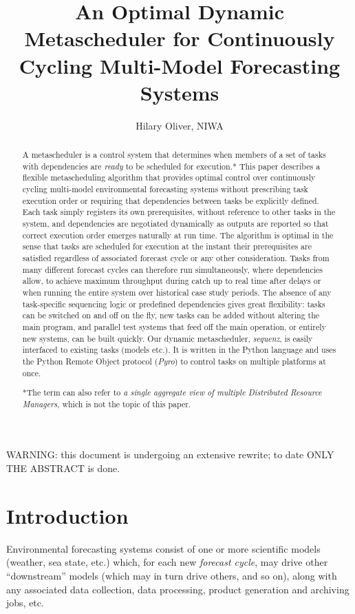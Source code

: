 \documentclass[11pt,a4paper]{article}
\title{An Optimal Dynamic Metascheduler for Continuously Cycling
Multi-Model Forecasting Systems}
\author{Hilary Oliver, NIWA}
\begin{document}
\maketitle
\tableofcontents

{\huge WARNING: this document is undergoing an extensive rewrite; to
date ONLY THE ABSTRACT is done.}

\begin{abstract}
A metascheduler is a control system that determines when members of a
set of tasks with dependencies are {\em ready} to be scheduled for
execution.* This paper describes a flexible metascheduling algorithm
that provides optimal control over continuously cycling multi-model
environmental forecasting systems without prescribing task execution
order or requiring that dependencies between tasks be explicitly
defined. Each task simply registers its own prerequisites, without
reference to other tasks in the system, and dependencies are negotiated
dynamically as outputs are reported so that correct execution order
emerges naturally at run time.  The algorithm is optimal in the sense
that tasks are scheduled for execution at the instant their
prerequisites are satisfied regardless of associated forecast cycle or
any other consideration. Tasks from many different forecast cycles can
therefore run simultaneously, where dependencies allow, to achieve
maximum throughput during catch up to real time after delays or when
running the entire system over historical case study periods. The
absence of any task-specific sequencing logic or predefined dependencies
gives great flexibility: tasks can be switched on and off on the fly,
new tasks can be added without altering the main program, and parallel
test systems that feed off the main operation, or entirely new systems,
can be built quickly.  Our dynamic metascheduler, {\em sequenz}, is
easily interfaced to existing tasks (models etc.). It is written in the
Python language and uses the Python Remote Object protocol ({\em Pyro})
to control tasks on multiple platforms at once. 

*The term can also refer to {\it a single aggregate view of multiple
Distributed Resource Managers}, which is not the topic of this paper.

\end{abstract}
\section{Introduction}

Environmental forecasting systems consist of one or more scientific
models (weather, sea state, etc.) which, for each new {\em forecast
cycle}, may drive other ``downstream'' models (which may in turn drive
others, and so on), along with any associated data collection, data
processing, product generation and archiving jobs, etc.
\end{document}
